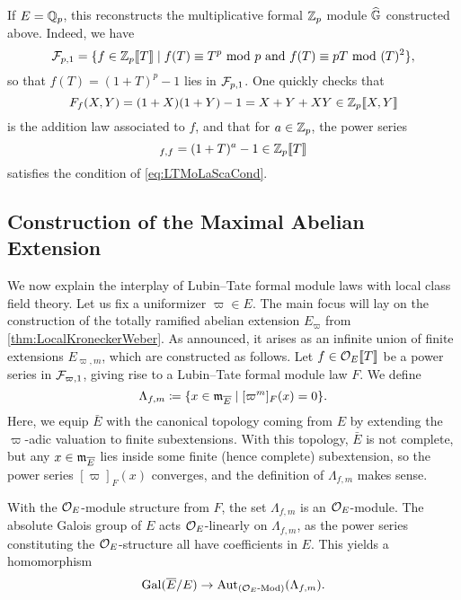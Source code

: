 \documentclass[../main.tex]{subfiles}
\begin{document}
\begin{xpl}
  If $E = \mathbb{Q}_p$, this reconstructs the multiplicative formal 
  $\mathbb{Z}_p$ module $\widehat{\mathbb{G}}$ constructed above. Indeed, we have 
  \begin{equation*}
    \mathcal{F}_{p,1} = \{f \in \mathbb{Z}_p\llbracket T \rrbracket \mid f(T) \equiv T^p \text{ mod } p
    \text{ and } f(T) \equiv pT \text{ mod } (T)^2 \},
  \end{equation*}
  so that $f(T) = (1+T)^p-1$ lies in $\mathcal{F}_{p,1}$.  
  One quickly checks that 
  \begin{equation*}
    F_f(X,Y) = (1+X)(1+Y) - 1 = X + Y + XY \in \mathbb{Z}_p \llbracket X,Y \rrbracket
  \end{equation*}
  is the addition law associated to $f$, and that 
  for $a \in \mathbb{Z}_p$, the power series
  \begin{equation*}
    [a]_{f,f} = (1+T)^{a} - 1 \in \Z_p \llbr T \rrbr
  \end{equation*}
  satisfies the condition of \eqref{eq:LTMoLaScaCond}. 
\end{xpl}

\subsection{Construction of the Maximal Abelian Extension} %
\label{sub:Construction of the Maximal Abelian Extension}
We now explain the interplay of Lubin--Tate formal module laws with 
local class field theory. Let us fix a uniformizer $\varpi \in E$. The main
focus will lay on the construction of the totally ramified abelian extension
$E_\varpi$ from \cref{thm:LocalKroneckerWeber}. As announced, it 
arises as an infinite union of finite extensions $E_{\varpi, m}$, which
are constructed as follows. Let $f \in \mathcal{O}_E\llbracket T \rrbracket$ be a power series
in $\mathcal{F}_{\varpi,1}$, giving rise to a
Lubin--Tate formal module law $F$. We define
\begin{equation*}
  \Lambda_{f,m} \coloneqq \{x \in \mathfrak{m}_{\overline E} \mid [\varpi^m]_F(x) = 0\}.
\end{equation*}
Here, we equip $\bar E$ with the canonical topology coming from $E$ by extending the
$\varpi$-adic valuation to finite subextensions. With this topology, $\bar E$
is not complete, but any $x \in \mathfrak{m}_{\overline E}$ lies inside some finite (hence
complete) subextension, so the power series $[\varpi]_F(x)$ converges, and the 
definition of $\Lambda_{f,m}$ makes sense.

With the $\mathcal{O}_E$-module structure from $F$, the set $\Lambda_{f,m}$ is an
$\mathcal{O}_E$-module. The absolute Galois group of $E$ acts $\mathcal{O}_E$-linearly on
$\Lambda_{f,m}$, as the power series constituting the $\mathcal{O}_E$-structure all
have coefficients in $E$. This yields a homomorphism 
\begin{equation} \label{eq:GaloisGroupToLambdaHom}
  \operatorname{Gal}(\overline E /E ) \to \operatorname{Aut}_{{({\mathcal{O}_E}\text-\allowbreak\mathrm{Mod})}}(\Lambda_{f,m}).
\end{equation}
\end{document}
